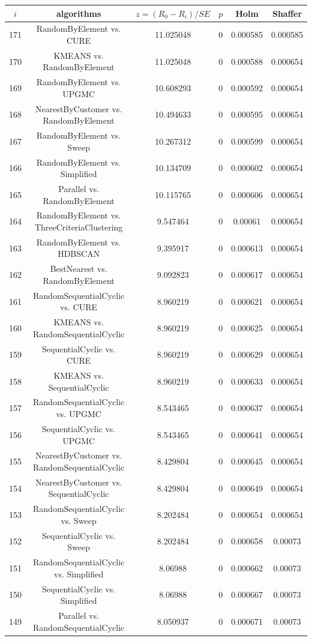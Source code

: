 \documentclass[a4paper,10pt]{article}
\begin{document}
\begin{landscape}
\begin{table}[!htp]
\centering\scriptsize
\begin{tabular}{cccccc}
$i$&algorithms&$z=(R_0 - R_i)/SE$&$p$&Holm&Shaffer\\
\hline171&RandomByElement vs. CURE&11.025048&0&0.000585&0.000585\\
170&KMEANS vs. RandomByElement&11.025048&0&0.000588&0.000654\\
169&RandomByElement vs. UPGMC&10.608293&0&0.000592&0.000654\\
168&NearestByCustomer vs. RandomByElement&10.494633&0&0.000595&0.000654\\
167&RandomByElement vs. Sweep&10.267312&0&0.000599&0.000654\\
166&RandomByElement vs. Simplified&10.134709&0&0.000602&0.000654\\
165&Parallel vs. RandomByElement&10.115765&0&0.000606&0.000654\\
164&RandomByElement vs. ThreeCriteriaClustering&9.547464&0&0.00061&0.000654\\
163&RandomByElement vs. HDBSCAN&9.395917&0&0.000613&0.000654\\
162&BestNearest vs. RandomByElement&9.092823&0&0.000617&0.000654\\
161&RandomSequentialCyclic vs. CURE&8.960219&0&0.000621&0.000654\\
160&KMEANS vs. RandomSequentialCyclic&8.960219&0&0.000625&0.000654\\
159&SequentialCyclic vs. CURE&8.960219&0&0.000629&0.000654\\
158&KMEANS vs. SequentialCyclic&8.960219&0&0.000633&0.000654\\
157&RandomSequentialCyclic vs. UPGMC&8.543465&0&0.000637&0.000654\\
156&SequentialCyclic vs. UPGMC&8.543465&0&0.000641&0.000654\\
155&NearestByCustomer vs. RandomSequentialCyclic&8.429804&0&0.000645&0.000654\\
154&NearestByCustomer vs. SequentialCyclic&8.429804&0&0.000649&0.000654\\
153&RandomSequentialCyclic vs. Sweep&8.202484&0&0.000654&0.000654\\
152&SequentialCyclic vs. Sweep&8.202484&0&0.000658&0.00073\\
151&RandomSequentialCyclic vs. Simplified&8.06988&0&0.000662&0.00073\\
150&SequentialCyclic vs. Simplified&8.06988&0&0.000667&0.00073\\
149&Parallel vs. RandomSequentialCyclic&8.050937&0&0.000671&0.00073\\

\end{tabular}
\end{table}
\end{landscape}
\end{document}
